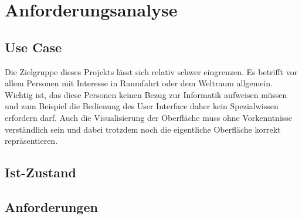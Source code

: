 \chapter{Anforderungsanalyse}

\section{Use Case}
Die Zielgruppe dieses Projekts lässt sich relativ schwer eingrenzen. Es betrifft vor allem Personen mit Interesse in Raumfahrt oder dem Weltraum allgemein. Wichtig ist, das diese Personen keinen Bezug zur Informatik aufweisen müssen und zum Beispiel die Bedienung des User Interface daher kein Spezialwissen erfordern darf. Auch die Visualisierung der Oberfläche muss ohne Vorkenntnisse verständlich sein und dabei trotzdem noch die eigentliche Oberfläche korrekt repräsentieren.

\section{Ist-Zustand}

\section{Anforderungen}

